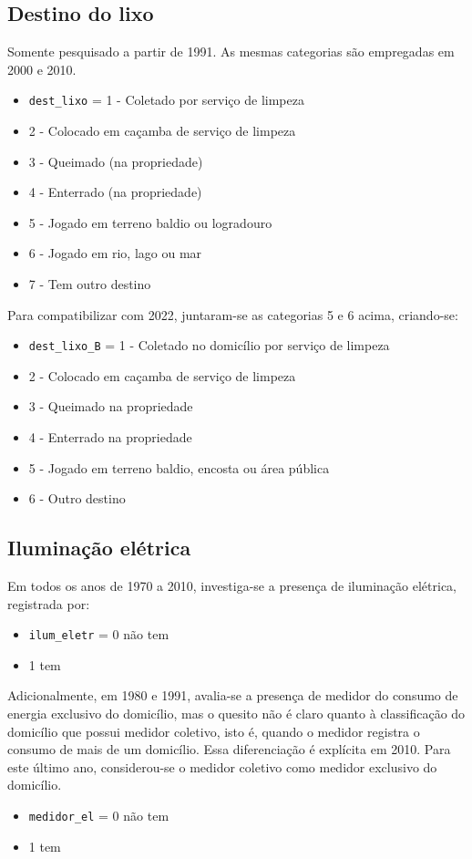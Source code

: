 \documentclass[12pt,a4paper]{article}
\newcommand{\vr}[1]{\texttt{#1}}
\begin{document}
\subsection{Destino do lixo}\label{sec:c9}
Somente pesquisado a partir de 1991. As mesmas categorias são empregadas em 2000 e 2010.
\begin{itemize}
  \item \vr{dest\_lixo} = 1 - Coletado por serviço de limpeza
  \item 2 - Colocado em caçamba de serviço de limpeza
  \item 3 - Queimado (na propriedade)
  \item 4 - Enterrado (na propriedade)
  \item 5 - Jogado em terreno baldio ou logradouro
  \item 6 - Jogado em rio, lago ou mar
  \item 7 - Tem outro destino
\end{itemize}

Para compatibilizar com 2022, juntaram-se as categorias 5 e 6 acima, criando-se:
\begin{itemize}
  \item \vr{dest\_lixo\_B} = 1 - Coletado no domicílio por serviço de limpeza
  \item 2 - Colocado em caçamba de serviço de limpeza
  \item 3 - Queimado na propriedade
  \item 4 - Enterrado na propriedade
  \item 5 - Jogado em terreno baldio, encosta ou área pública
  \item 6 - Outro destino
\end{itemize}

\subsection{Iluminação elétrica}\label{sec:c10}
Em todos os anos de 1970 a 2010, investiga-se a presença de iluminação elétrica, registrada por:
\begin{itemize}
  \item \vr{ilum\_eletr} = 0 não tem
  \item 1 tem
\end{itemize}

Adicionalmente, em 1980 e 1991, avalia-se a presença de medidor do consumo de energia exclusivo do domicílio, mas o quesito não é claro quanto à classificação do domicílio que possui medidor coletivo, isto é, quando o medidor registra o consumo de mais de um domicílio. Essa diferenciação é explícita em 2010. Para este último ano, considerou-se o medidor coletivo como medidor exclusivo do domicílio.
\begin{itemize}
  \item \vr{medidor\_el} = 0 não tem
  \item 1 tem
\end{itemize}
\end{document}
